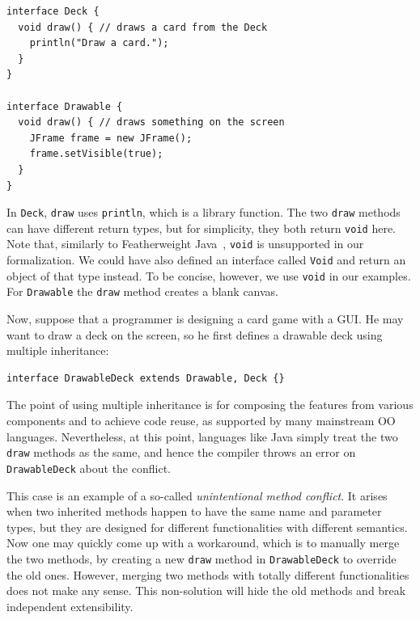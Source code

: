 \vspace{3pt}\begin{lstlisting}
interface Deck {
  void draw() { // draws a card from the Deck
    println("Draw a card.");
  }
}

interface Drawable {
  void draw() { // draws something on the screen
    JFrame frame = new JFrame();
    frame.setVisible(true);
  }
}
\end{lstlisting}\vspace{3pt}
In \lstinline|Deck|,
\lstinline|draw| uses \lstinline|println|, which is a
library function. 
The two \lstinline|draw| methods can have different return types, but for simplicity, 
they both return \lstinline|void| here. Note that, similarly to
Featherweight Java~\cite{Igarashi01FJ}, \lstinline|void| is
unsupported in our formalization. We could have also defined an interface called \lstinline|Void|
and return an object of that type instead. To be concise, however, we
use \lstinline|void| in our examples.
For \lstinline|Drawable| the \lstinline|draw| method
creates a blank canvas.

Now, suppose that a programmer is designing a
card game with a GUI. He may want to draw a deck on the screen, so he first defines a drawable
deck using multiple inheritance:

\vspace{3pt}\begin{lstlisting}
interface DrawableDeck extends Drawable, Deck {} 
\end{lstlisting}\vspace{3pt}
The point of using multiple inheritance is for composing the features from various 
components and to achieve code reuse, as supported by many mainstream OO
languages. Nevertheless, at this point, languages like Java simply treat the two \lstinline|draw| methods
as the same, and hence the compiler throws an error
on \lstinline|DrawableDeck| about the conflict.

This case is an example of a so-called \textit{unintentional method conflict}. It arises when two inherited methods happen to have
the same name and parameter types, but they are designed for different functionalities with different semantics.
Now one may quickly come up with a workaround, which is to manually
merge the two methods, by
creating a new \lstinline|draw| method in \lstinline|DrawableDeck| to
override the old ones. However, merging two methods with totally different functionalities does not make any sense.
This non-solution will hide the
old methods and break independent extensibility.

